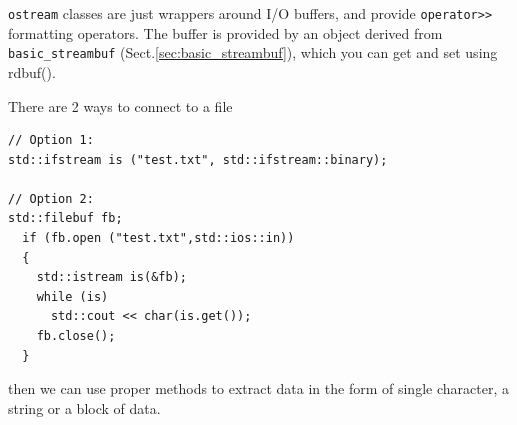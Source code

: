 \verb!ostream! classes are just wrappers around I/O buffers, and provide
\verb!operator>>! formatting operators. The buffer is provided by an object
derived from \verb!basic_streambuf! (Sect.\ref{sec:basic_streambuf}), which you
can get and set using rdbuf().


There are 2 ways to connect to a file
\begin{verbatim}
// Option 1:
std::ifstream is ("test.txt", std::ifstream::binary);

// Option 2:
std::filebuf fb;
  if (fb.open ("test.txt",std::ios::in))
  {
    std::istream is(&fb);
    while (is)
      std::cout << char(is.get());
    fb.close();
  }
\end{verbatim}
then we can use proper methods to extract data in the form of single character,
a string or a block of data.

